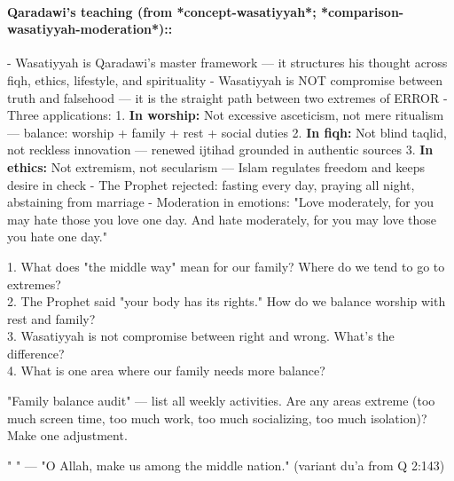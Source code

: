 \documentclass[11pt,a4paper]{article}
\begin{document}
\paragraph*{Qaradawi's teaching (from *concept-wasatiyyah*; *comparison-wasatiyyah-moderation*)::}  - Wasatiyyah is Qaradawi's master framework --- it structures his thought across fiqh, ethics, lifestyle, and spirituality - Wasatiyyah is NOT compromise between truth and falsehood --- it is the straight path between two extremes of ERROR - Three applications: 1. \textbf{In worship:} Not excessive asceticism, not mere ritualism --- balance: worship + family + rest + social duties 2. \textbf{In fiqh:} Not blind taqlid, not reckless innovation --- renewed ijtihad grounded in authentic sources 3. \textbf{In ethics:} Not extremism, not secularism --- Islam regulates freedom and keeps desire in check - The Prophet rejected: fasting every day, praying all night, abstaining from marriage - Moderation in emotions: "Love moderately, for you may hate those you love one day. And hate moderately, for you may love those you hate one day."

\begin{discussionbox} 1. What does "the middle way" mean for our family? Where do we tend to go to extremes? \\ 2. The Prophet said "your body has its rights." How do we balance worship with rest and family? \\ 3. Wasatiyyah is not compromise between right and wrong. What's the difference? \\ 4. What is one area where our family needs more balance? \end{discussionbox}

\begin{activitybox} "Family balance audit" --- list all weekly activities. Are any areas extreme (too much screen time, too much work, too much socializing, too much isolation)? Make one adjustment. \end{activitybox}

\begin{duabox} "    " --- "O Allah, make us among the middle nation." (variant du'a from Q 2:143) \end{duabox}

\vspace{6pt}\noindent{\color{border}\rule{\textwidth}{0.5pt}}\vspace{6pt}
\end{document}
